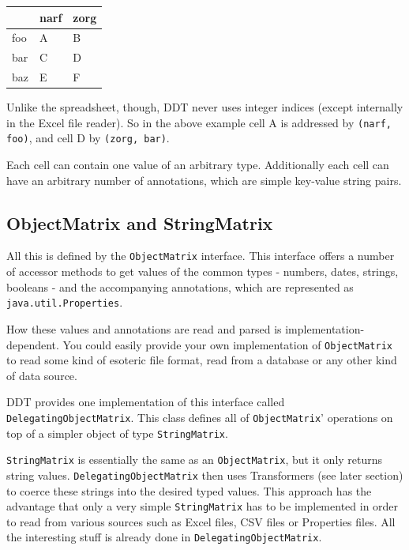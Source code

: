 \begin{tabular}{|l|l|l|}
\hline
 & narf & zorg \\
\hline
foo & A & B \\
\hline
bar & C & D \\
\hline
baz & E & F \\
\hline
\end{tabular}


Unlike the spreadsheet, though, \textsf{DDT} never uses integer indices (except internally in the \textsf{Excel} file reader). So in the above example cell A is addressed by \texttt{(narf, foo)}, and cell D by \texttt{(zorg, bar)}.

Each cell can contain one value of an arbitrary type. Additionally each cell can have an arbitrary number of annotations, which are simple key-value string pairs.


\subsection{ObjectMatrix and StringMatrix} %
\label{sub:objectmatrix_and_stringmatrix}

All this is defined by the \texttt{ObjectMatrix} interface. This interface offers a number of accessor methods to get values of the common types - numbers, dates, strings, booleans - and the accompanying annotations, which are represented as \texttt{java.util.Properties}.

How these values and annotations are read and parsed is implementation-dependent. You could easily provide your own implementation of \texttt{ObjectMatrix} to read some kind of esoteric file format, read from a database or any other kind of data source.

\textsf{DDT} provides one implementation of this interface called \texttt{DelegatingObjectMatrix}. This class defines all of \texttt{ObjectMatrix}' operations on top of a simpler object of type \texttt{StringMatrix}.

\texttt{StringMatrix} is essentially the same as an \texttt{ObjectMatrix}, but it only returns string values. \texttt{DelegatingObjectMatrix} then uses Transformers (see later section) to coerce these strings into the desired typed values. This approach has the advantage that only a very simple \texttt{StringMatrix} has to be implemented in order to read from various sources such as \textsf{Excel} files, CSV files or Properties files. All the interesting stuff is already done in \texttt{DelegatingObjectMatrix}.

